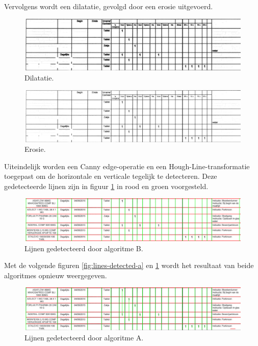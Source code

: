 Vervolgens wordt een dilatatie, gevolgd door een erosie uitgevoerd.

\begin{figure}[H]
    \centering
    \includegraphics[width=1\textwidth]{img/line_detection_b_2_image_eroded.png}
    \caption{Dilatatie.}
\end{figure}

\begin{figure}[H]
    \centering
    \includegraphics[width=1\textwidth]{img/line_detection_b_3_image_dilated.png}
    \caption{Erosie.}
\end{figure}

Uiteindelijk worden een Canny edge-operatie en een Hough-Line-transformatie toegepast om de horizontale en verticale tegelijk te detecteren. Deze gedetecteerde lijnen zijn in figuur \ref{fig:lines-detected-b} in rood en groen voorgesteld.

\begin{figure}[H]
    \centering
    \includegraphics[width=1\textwidth]{img/lines_detected_b.png}
    \caption{Lijnen gedetecteerd door algoritme B.}
    \label{fig:lines-detected-b}
\end{figure}

Met de volgende figuren \ref{fig:lines-detected-a} en \ref{fig:lines-detected-b} wordt het resultaat van beide algoritmes opnieuw weergegeven.

\begin{figure}[H]
    \centering
    \includegraphics[width=1\textwidth]{img/lines_detected_a.png}
    \caption{Lijnen gedetecteerd door algoritme A.}
    \label{fig:lines-detected-a-overzicht}
\end{figure}

